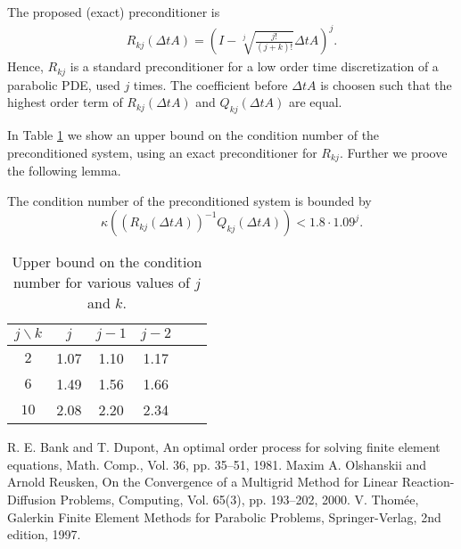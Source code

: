 \documentclass{report}
\begin{document}
The proposed (exact) preconditioner is
\begin{eqnarray*}
R_{kj} (\Delta t A) =\left( I- \sqrt[j]{\frac {j!}{(j+k)!}}\Delta t A \right)^j.
\end{eqnarray*}
Hence, $R_{kj}$ is a standard preconditioner for a low
order time discretization of a parabolic PDE, used
$j$ times.
The coefficient before $\Delta t A$ is choosen such that the
highest order term of $R_{kj}(\Delta t A)$
and $Q_{kj} (\Delta t A)$ are equal.

In Table \ref{cond} we show an upper bound on the condition
number of the preconditioned system, using an exact preconditioner
for $R_{kj}$. Further we proove the following lemma.

\begin{lemma}
The condition number of
the preconditioned system is bounded by
\begin{equation*}
\kappa \left( \left( R_{kj}(\Delta t A) \right)^{-1} Q_{kj}(\Delta t
A) \right) < 1.8 \cdot 1.09^j.
\end{equation*}
\end{lemma}

\begin{table}
\begin{center}
\begin{tabular}{|c|c|c|c|c|c|}
\hline
$j\backslash k$& $j$ & $j-1$ & $j-2$ \\ \hline
$2$ & 1.07 & 1.10 & 1.17 \\ \hline
$6$ & 1.49 & 1.56 & 1.66 \\ \hline
$10$ & 2.08 & 2.20 & 2.34 \\ \hline
\end{tabular}
\end{center}
\caption{Upper bound on the condition number for various values of $j$ and $k$.}
\label{cond}
\end{table}

\begin{thebibliography}{9}
 R. E. Bank and T. Dupont, An optimal order process for
solving finite element equations, Math. Comp., Vol. 36, pp. 35--51,
1981.
 Maxim A. Olshanskii and Arnold
Reusken, On the Convergence of a Multigrid Method for Linear
Reaction-Diffusion Problems, Computing, Vol. 65(3), pp. 193--202,
2000.
 V. Thom\'{e}e, Galerkin Finite Element Methods for
Parabolic Problems, Springer-Verlag, 2nd edition, 1997.
\end{thebibliography}
\end{document}
